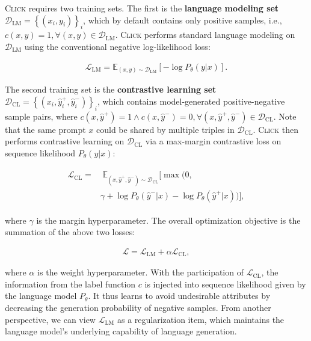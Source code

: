 \textsc{Click} requires two training sets. The first is the \textbf{language modeling set} $\mathcal{D}_\mathrm{LM} = \left\{ (x_i, y_i) \right\}_{i}$, which by default contains only positive samples, i.e., $c(x, y) = 1, \forall (x, y) \in \mathcal{D}_\mathrm{LM}$.
\textsc{Click} performs standard language modeling on $\mathcal{D}_\mathrm{LM}$ using the conventional negative log-likelihood loss:

\begin{align} \label{equ:lm}
    \mathcal{L}_\mathrm{LM} = \mathbb{E}_{(x, y) \sim \mathcal{D}_\mathrm{LM}} [ - \log P_{\theta} (y | x) ].
\end{align}

The second training set is the \textbf{contrastive learning set} $\mathcal{D}_\mathrm{CL} = \left\{ (x_i, \hat{y}_i^{+}, \hat{y}_i^{-}) \right\}_i$, which contains model-generated positive-negative sample pairs, where $c(x, \hat{y}^{+}) = 1 \wedge c(x, \hat{y}^{-}) = 0, \forall (x, \hat{y}^{+}, \hat{y}^{-}) \in \mathcal{D}_\mathrm{CL}$.
Note that the same prompt $x$ could be shared by multiple triples in $\mathcal{D}_\mathrm{CL}$.
\textsc{Click} then performs contrastive learning on $\mathcal{D}_\mathrm{CL}$ via a max-margin contrastive loss on sequence likelihood $P_{\theta} (y | x)$:

\begin{align} \label{equ:cl}
\begin{aligned}
    \mathcal{L}_\mathrm{CL} =&\ \mathbb{E}_{( x, \hat{y}^{+}, \hat{y}^{-} ) \sim \mathcal{D}_\mathrm{CL}} [ \max (0, \\
    &\gamma + \log P_{\theta} (\hat{y}^{-} | x) - \log P_{\theta} (\hat{y}^{+} | x) ) ],
\end{aligned}
\end{align}

where $\gamma$ is the margin hyperparameter. The overall optimization objective is the summation of the above two losses:

\begin{align} \label{equ:all}
  \mathcal{L} = \mathcal{L}_\mathrm{LM} + \alpha \mathcal{L}_\mathrm{CL}, 
\end{align}

where $\alpha$ is the weight hyperparameter. With the participation of $\mathcal{L}_\mathrm{CL}$, the information from the label function $c$ is injected into sequence likelihood given by the language model $P_{\theta}$.
It thus learns to avoid undesirable attributes by decreasing the generation probability of negative samples. From another perspective, we can view $\mathcal{L}_\mathrm{LM}$ as a regularization item, which maintains the language model's underlying capability of language generation.

